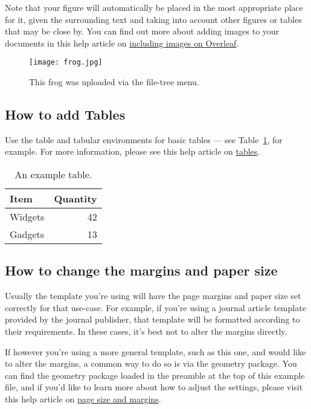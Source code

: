 \documentclass{article}
\begin{document}
Note that your figure will automatically be placed in the most appropriate place for it, given the surrounding text and taking into account other figures or tables that may be close by. You can find out more about adding images to your documents in this help article on \href{https://www.overleaf.com/learn/how-to/Including_images_on_Overleaf}{including images on Overleaf}.

\begin{figure}
\centering
\texttt{[image: frog.jpg]}
\caption{\label{fig:frog}This frog was uploaded via the file-tree menu.}
\end{figure}

\subsection{How to add Tables}

Use the table and tabular environments for basic tables --- see Table~\ref{tab:widgets}, for example. For more information, please see this help article on \href{https://www.overleaf.com/learn/latex/tables}{tables}. 

\begin{table}
\centering
\begin{tabular}{l|r}
Item & Quantity \\\hline
Widgets & 42 \\
Gadgets & 13
\end{tabular}
\caption{\label{tab:widgets}An example table.}
\end{table}

\subsection{How to change the margins and paper size}

Usually the template you're using will have the page margins and paper size set correctly for that use-case. For example, if you're using a journal article template provided by the journal publisher, that template will be formatted according to their requirements. In these cases, it's best not to alter the margins directly.

If however you're using a more general template, such as this one, and would like to alter the margins, a common way to do so is via the geometry package. You can find the geometry package loaded in the preamble at the top of this example file, and if you'd like to learn more about how to adjust the settings, please visit this help article on \href{https://www.overleaf.com/learn/latex/page_size_and_margins}{page size and margins}.



\end{document}
